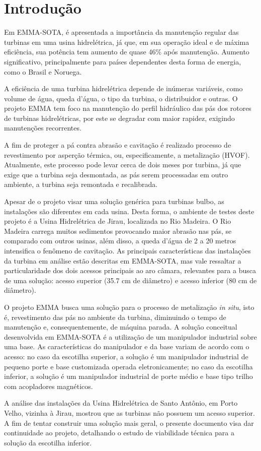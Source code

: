 \section{Introdução}\label{sec::introducao}

Em EMMA-SOTA, é apresentada a importância da manutenção regular das turbinas em
uma usina hidrelétrica, já que, em sua operação ideal e de máxima eficiência,
sua potência tem aumento de quase 46\% após manutenção. Aumento significativo,
principalmente para países dependentes desta forma de energia, como o Brasil e
Noruega.

A eficiência de uma turbina hidrelétrica depende de inúmeras variáveis, como
volume de água, queda d'água, o tipo da turbina, o distribuidor e outras. O
projeto EMMA tem foco na manutenção do perfil hidráulico das pás dos rotores de
turbinas hidrelétricas, por este se degradar com maior rapidez, exigindo
manutenções recorrentes. 

A fim de proteger a pá contra abrasão e cavitação é realizado processo de
revestimento por asperção térmica, ou, especificamente, a metalização (HVOF).
Atualmente, este processo pode levar cerca de dois meses por turbina,
já que exige que a turbina seja desmontada, as pás serem processadas em
outro ambiente, a turbina seja remontada e recalibrada.

Apesar de o projeto visar uma solução genérica para turbinas bulbo, as
instalações são diferentes em cada usina. Desta forma, o ambiente de testes
deste projeto é a Usina Hidrelétrica de Jirau, localizada no Rio Madeira. O Rio
Madeira carrega muitos sedimentos provocando maior abrasão nas pás, se comparado
com outros usinas, além disso, a queda d'água de 2 a 20 metros intensifica o
fenômeno de cavitação. As principais características das instalações da turbina
em análise estão descritas em EMMA-SOTA, mas vale ressaltar a particularidade
dos dois acessos principais ao aro câmara, relevantes para a busca de uma
solução: acesso superior (35.7 cm de diâmetro) e acesso inferior (80 cm de
diâmetro).

O projeto EMMA busca uma solução para o processo de metalização \textit{in
situ}, isto é, revestimento das pás no ambiente da turbina, diminuindo o tempo
de manutenção e, consequentemente, de máquina parada.  A solução conceitual
desenvolvida em EMMA-SOTA é a utilização de um manipulador industrial sobre uma
base. As características do manipulador e da base variam de acordo com o
acesso: no caso da escotilha superior, a solução é um manipulador industrial de
pequeno porte e base customizada operada eletronicamente; no caso da escotilha
inferior, a solução é um manipulador industrial de porte médio e base tipo
trilho com acopladores magnéticos.

A análise das instalações da Usina Hidrelétrica de Santo Antônio, em Porto
Velho, vizinha à Jirau, mostrou que as turbinas não possuem um acesso superior.
A fim de tentar construir uma solução mais geral, o presente documento visa dar
continuidade ao projeto, detalhando o estudo de viabilidade técnica para a
solução da escotilha inferior.

